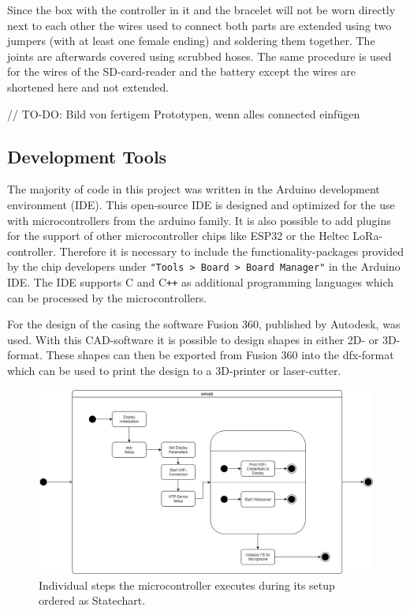 Since the box with the controller in it and the bracelet will not be worn directly next to each other the wires used to connect both parts are extended using two jumpers (with at least one female ending) and soldering them together.
The joints are afterwards covered using scrubbed hoses. 
The same procedure is used for the wires of the SD-card-reader and the battery except the wires are shortened here and not extended.

// TO-DO: Bild von fertigem Prototypen, wenn alles connected einfügen

\subsection{Development Tools}
The majority of code in this project was written in the Arduino development environment (IDE). 
This open-source IDE is designed and optimized for the use with microcontrollers from the arduino family.
It is also possible to add plugins for the support of other microcontroller chips like ESP32 or the Heltec LoRa-controller.
Therefore it is necessary to include the functionality-packages provided by the chip developers under \texttt{"Tools > Board > Board Manager"} in the Arduino IDE.
The IDE supports C and C\texttt{++} as additional programming languages which can be processed by the microcontrollers.

For the design of the casing the software Fusion 360, published by Autodesk, was used.
With this CAD-software it is possible to design shapes in either 2D- or 3D-format.
These shapes can then be exported from Fusion 360 into the dfx-format which can be used to print the design to a 3D-printer or laser-cutter.

\begin{figure}[H]
	\includegraphics[width=\linewidth]{Media/Controller_setup.png}
	\caption{Individual steps the microcontroller executes during its setup ordered as Statechart.}
	\label{fig:cntrlr_stp}
\end{figure}

